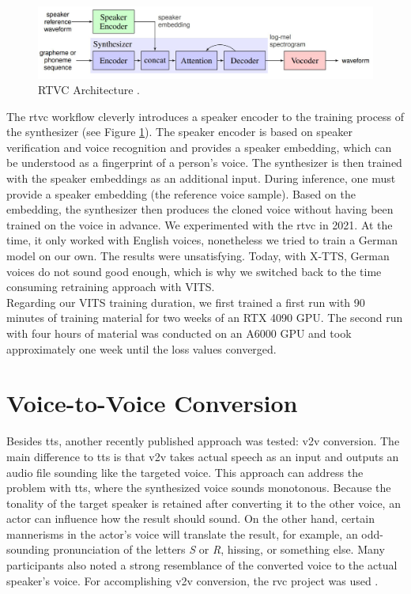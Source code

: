 \documentclass[
  a4paper,  %
  twoside,  %
  bibliography=totoc,
  headsepline,
  cleardoublepage=empty,
  parskip=half,
  draft=false
]{scrbook}
\begin{document}
\begin{figure}[h]
  \centering
  \includegraphics[width=1\textwidth]{./graphics/rtvc.png}
  \caption{RTVC Architecture \cite{jemineRealTimeVoiceCloning2019}.}
  \label{fig:rtvc-arch}
\end{figure}

The \gls{rtvc} workflow cleverly introduces a speaker encoder to the training process of the synthesizer (see Figure \ref{fig:rtvc-arch}). The speaker encoder is based on speaker verification and voice recognition and provides a speaker embedding, which can be understood as a fingerprint of a person's voice. The synthesizer is then trained with the speaker embeddings as an additional input. During inference, one must provide a speaker embedding (the reference voice sample). Based on the embedding, the synthesizer then produces the cloned voice without having been trained on the voice in advance. We experimented with the \gls{rtvc} in 2021. At the time, it only worked with English voices, nonetheless we tried to train a German model on our own. The results were unsatisfying. Today, with X-TTS, German voices do not sound good enough, which is why we switched back to the time consuming retraining approach with VITS. \\
Regarding our VITS training duration, we first trained a first run with 90 minutes of training material for two weeks of an RTX 4090 GPU. The second run with four hours of material was conducted on an A6000 GPU and took approximately one week until the loss values converged. 

\section{Voice-to-Voice Conversion}
\label{sec:v2v}
Besides \gls{tts}, another recently published approach was tested: \gls{v2v} conversion. The main difference to \gls{tts} is that \gls{v2v} takes actual speech as an input and outputs an audio file sounding like the targeted voice. This approach can address the problem with \gls{tts}, where the synthesized voice sounds monotonous. Because the tonality of the target speaker is retained after converting it to the other voice, an actor can influence how the result should sound. On the other hand, certain mannerisms in the actor's voice will translate the result, for example, an odd-sounding pronunciation of the letters \textit{S} or \textit{R}, hissing, or something else. Many participants also noted a strong resemblance of the converted voice to the actual speaker's voice. For accomplishing \gls{v2v} conversion, the \gls{rvc} project was used \cite{RVCProjectRetrievalbasedVoiceConversionWebUI2023}. 
\end{document}
